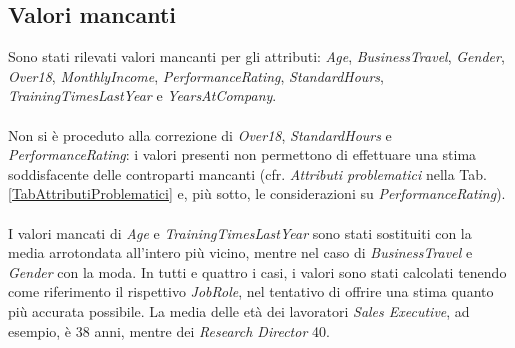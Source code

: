 \subsection{Valori mancanti}
Sono stati rilevati valori mancanti per gli attributi: \textit{Age}, \textit{BusinessTravel}, \textit{Gender}, \textit{Over18}, \textit{MonthlyIncome}, \textit{PerformanceRating}, \textit{StandardHours}, \textit{TrainingTimesLastYear} e \textit{YearsAtCompany}. \\\\
Non si è proceduto alla correzione di \textit{Over18}, \textit{StandardHours} e \textit{PerformanceRating}: i valori presenti non permettono di effettuare una stima soddisfacente delle controparti mancanti (cfr. \textit{Attributi problematici} nella Tab. \ref{TabAttributiProblematici} e, più sotto, le considerazioni su \textit{PerformanceRating}).\\\\I valori mancati di \textit{Age} e \textit{TrainingTimesLastYear} sono stati sostituiti con la media arrotondata all’intero più vicino, mentre nel caso di \textit{BusinessTravel} e \textit{Gender} con la moda. In tutti e quattro i casi, i valori sono stati calcolati tenendo come riferimento il rispettivo \textit{JobRole}, nel tentativo di offrire una stima quanto più accurata possibile. La media delle età dei lavoratori \textit{Sales Executive}, ad esempio, è 38 anni, mentre dei \textit{Research Director} 40.

